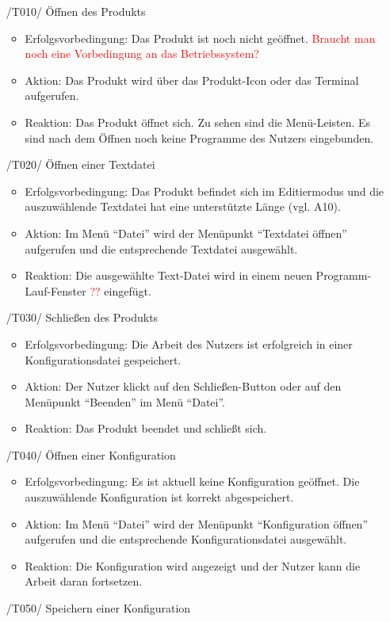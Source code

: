 \documentclass[parskip=full]{scrartcl}
\newcommand\frage[1]{\textcolor{red}{#1}}
\begin{document}
\begin{itemize}
	\item[/T010/] Öffnen des Produkts
	\begin{itemize}
		\item Erfolgsvorbedingung: Das Produkt ist noch nicht geöffnet.
		\frage{Braucht man noch eine Vorbedingung an das Betriebssystem?}
		\item Aktion: Das Produkt wird über das Produkt-Icon oder das Terminal aufgerufen.
		\item Reaktion: Das Produkt öffnet sich. Zu sehen sind die Menü-Leisten. Es sind nach dem Öffnen noch keine Programme des Nutzers eingebunden.
	\end{itemize}
	
	\item[/T020/] Öffnen einer Textdatei
	\begin{itemize}
		\item Erfolgsvorbedingung: Das Produkt befindet sich im \gls{Editiermodus} und die auszuwählende Textdatei hat eine unterstützte Länge (vgl. A10).
		\item Aktion: Im Menü \enquote{Datei} wird der Menüpunkt \enquote{Textdatei öffnen} aufgerufen und die entsprechende Textdatei ausgewählt.
		\item Reaktion: Die ausgewählte Text-Datei wird in einem neuen Programm-Lauf-Fenster \frage{??} eingefügt.
	\end{itemize}	

	\item[/T030/] Schließen des Produkts
	\begin{itemize}
		\item Erfolgsvorbedingung: Die Arbeit des Nutzers ist erfolgreich in einer \gls{Konfigurationsdatei} gespeichert.
		\item Aktion: Der Nutzer klickt auf den Schließen-Button oder auf den Menüpunkt \enquote{Beenden} im Menü \enquote{Datei}.
		\item Reaktion: Das Produkt beendet und schließt sich.
	\end{itemize}	
	
	\item[/T040/] Öffnen einer Konfiguration
		\begin{itemize}
		\item Erfolgsvorbedingung: Es ist aktuell keine Konfiguration geöffnet. Die auszuwählende Konfiguration ist korrekt abgespeichert.
		\item Aktion: Im Menü \enquote{Datei} wird der Menüpunkt \enquote{Konfiguration öffnen} aufgerufen und die entsprechende \gls{Konfigurationsdatei} ausgewählt.
		\item Reaktion: Die Konfiguration wird angezeigt und der Nutzer kann die Arbeit daran fortsetzen.		
	\end{itemize}	
	
	\item[/T050/] Speichern einer Konfiguration
	
	\end{itemize}
	
\end{document}
